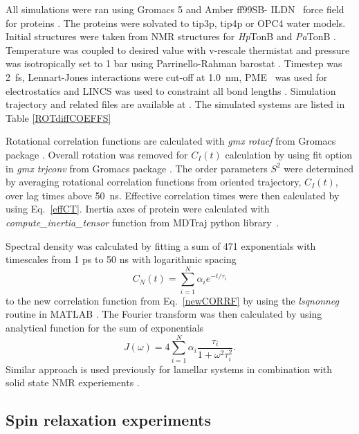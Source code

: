 \documentclass[pre,aps,floatfix,authordate1-4,twocolumn]{revtex4-1}
\begin{document}
All simulations were ran using Gromacs 5 \cite{abraham15}
and Amber ff99SB- ILDN~\cite{lindorff10} force field for proteins . The proteins were solvated
to tip3p\cite{jorgensen83}, tip4p \cite{jorgensen83} or OPC4 \cite{izadi14} water models.
Initial structures were taken from NMR structures for {\it Hp}TonB \cite{ciragan16} and
{\it Pa}TonB \cite{??}.
Temperature was coupled to desired value with v-rescale thermistat \cite{bussi07} and pressure was 
isotropically set to 1 bar using Parrinello-Rahman barostat \cite{parrinello81}.
Timestep was 2~fs, Lennart-Jones interactions were cut-off at 1.0~nm,
PME~\cite{darden93,essman95} was used for electrostatics and LINCS was used
to constraint all bond lengths \cite{hess07}. Simulation trajectory and related
files are available at \cite{??}. The simulated systems are listed
in Table \ref{ROTdiffCOEFFS}


Rotational correlation functions are calculated with {\it gmx rotacf} from
Gromacs package \cite{gromacsMANUAL}. Overall rotation was removed
for $C_I(t)$ calculation by using fit option in {\it gmx trjconv}
from Gromacs package \cite{gromacsMANUAL}. The order parameters $S^2$
were determined by averaging rotational correlation functions from
oriented trajectory, $C_I(t)$, over lag times above 50~ns. Effective correlation times were then
calculated by using Eq.~\ref{effCT}. 
Inertia axes of protein were calculated with {\it compute\_inertia\_tensor}
function from MDTraj python library~\cite{McGibbon2015MDTraj}.

Spectral density was calculated by fitting a
sum of 471 exponentials with timescales from 1 ps to 50 ns
with logarithmic spacing
\begin{equation}\label{gprime_fit}
C_N(t)=\sum_{i=1}^{N}\alpha_i e^{-t/\tau_i}
\end{equation}
to the new correlation function from Eq.~\ref{newCORRF}
by using the {\it lsqnonneg} routine in MATLAB \cite{matlab}.
The Fourier transform was then calculated by using analytical function
for the sum of exponentials 
\begin{equation}\label{FTanal}
J(\omega) =  4 \sum_{i=1}^{N}\alpha_i\frac{\tau_i}{1+\omega^2\tau_i^2}.
\end{equation}
Similar approach is used previously for lamellar systems in combination
with solid state NMR experiements \cite{nowacka13,ferreira15}.


\subsection{Spin relaxation experiments}
\end{document}
